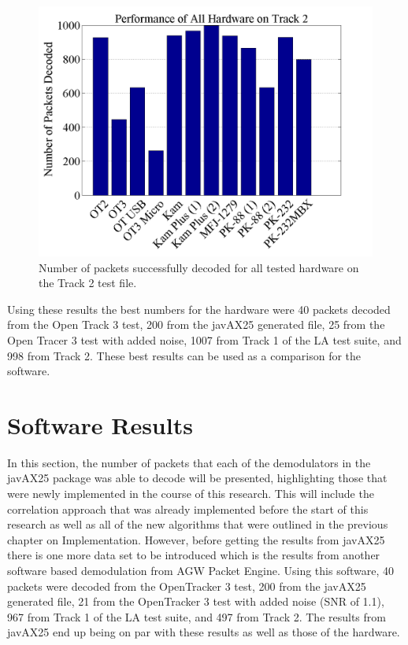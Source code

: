  \begin{figure}
  \centering
	\includegraphics[width=0.75\linewidth]{images/PerformanceofAllHardwareonTrack2.png} 
	\caption{Number of packets successfully decoded for all tested hardware on the Track 2 test file.}
   \label{allHardwareTrack2}
\end{figure}

Using these results the best numbers for the hardware were 40 packets decoded from the Open Track 3 test, 200 from the javAX25 generated file, 25 from the Open Tracer 3 test with added noise, 1007 from Track 1 of the LA test suite, and 998 from Track 2. These best results can be used as a comparison for the software.

\section{Software Results}
In this section, the number of packets that each of the demodulators in the javAX25 package was able to decode will be presented, highlighting those that were newly implemented in the course of this research. This will include the correlation approach that was already implemented before the start of this research as well as all of the new algorithms that were outlined in the previous chapter on Implementation. However, before getting the results from javAX25 there is one more data set to be introduced which is the results from another software based demodulation from AGW Packet Engine. Using this software, 40 packets were decoded from the OpenTracker 3 test, 200 from the javAX25 generated file, 21 from the OpenTracker 3 test with added noise (SNR of 1.1), 967 from Track 1 of the LA test suite, and 497 from Track 2. The results from javAX25 end up being on par with these results as well as those of the hardware.

